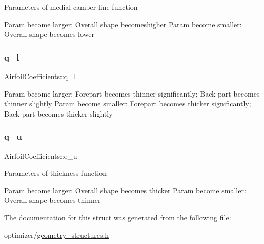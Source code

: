 Parameters of medial-\/camber line function

Param become larger\+: Overall shape becomeshigher Param become smaller\+: Overall shape becomes lower \mbox{\label{struct_airfoil_coefficients_aed33b0307a2bfcee3531fa2b240de679}} 
\subsubsection{\texorpdfstring{q\+\_\+l}{q\_l}}
{\footnotesize\ttfamily Airfoil\+Coefficients\+::q\+\_\+l}

Param become larger\+: Forepart becomes thinner significantly; Back part becomes thinner slightly Param become smaller\+: Forepart becomes thicker significantly; Back part becomes thicker slightly \mbox{\label{struct_airfoil_coefficients_a5d7aa2c02b9adfe9adcc86d2034f647f}} 
\subsubsection{\texorpdfstring{q\+\_\+u}{q\_u}}
{\footnotesize\ttfamily Airfoil\+Coefficients\+::q\+\_\+u}

Parameters of thickness function

Param become larger\+: Overall shape becomes thicker Param become smaller\+: Overall shape becomes thinner 

The documentation for this struct was generated from the following file\+:\begin{DoxyCompactItemize}
\item 
optimizer/\hyperlink{geometry__structures_8h}{geometry\+\_\+structures.\+h}\end{DoxyCompactItemize}
